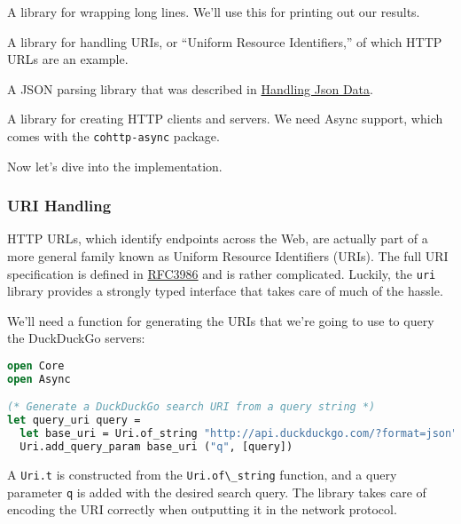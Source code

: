 \begin{description}
\tightlist
\item[\texttt{textwrap}]
A library for wrapping long lines. We'll use this for printing out our
results.
\item[\texttt{uri}]
A library for handling URIs, or ``Uniform Resource Identifiers,'' of
which HTTP URLs are an example.
\item[\texttt{yojson}]
A JSON parsing library that was described in
\href{json.html\#handling-json-data}{Handling Json Data}.
\item[\texttt{cohttp}]
A library for creating HTTP clients and servers. We need Async support,
which comes with the \passthrough{\lstinline!cohttp-async!} package.
\end{description}

Now let's dive into the implementation.

\hypertarget{uri-handling}{%
\subsubsection{URI Handling}\label{uri-handling}}

HTTP URLs, which identify endpoints across the Web, are actually part of
a more general family known as Uniform Resource Identifiers (URIs). The
full URI specification is defined in
\href{http://tools.ietf.org/html/rfc3986}{RFC3986} and is rather
complicated. Luckily, the \passthrough{\lstinline!uri!} library provides
a strongly typed interface that takes care of much of the hassle.

We'll need a function for generating the URIs that we're going to use to
query the DuckDuckGo servers:

\begin{lstlisting}[language=Caml]
open Core
open Async

(* Generate a DuckDuckGo search URI from a query string *)
let query_uri query =
  let base_uri = Uri.of_string "http://api.duckduckgo.com/?format=json" in
  Uri.add_query_param base_uri ("q", [query])
\end{lstlisting}

A \passthrough{\lstinline!Uri.t!} is constructed from the
\passthrough{\lstinline!Uri.of\_string!} function, and a query parameter
\passthrough{\lstinline!q!} is added with the desired search query. The
library takes care of encoding the URI correctly when outputting it in
the network protocol.

